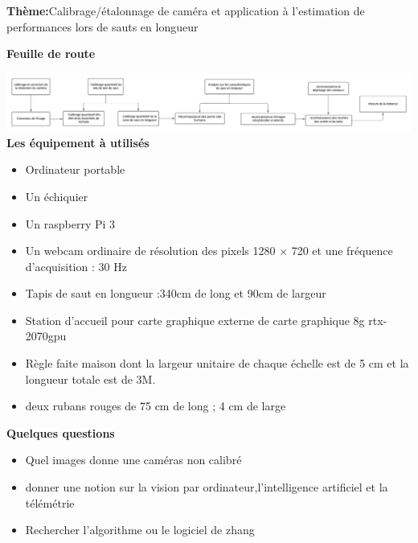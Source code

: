 \documentclass[10pt,a4paper]{article}
\begin{document}
	
	
	\textbf{Thème:}Calibrage/étalonnage de caméra et application à l’estimation de
	performances lors de sauts en longueur 
	
	
	\begin{center}
		\textbf{Feuille de route}
	\end{center}
	
	\includegraphics[scale=0.40]{image/Feuille de route}\\
	
	
\textbf{Les équipement à utilisés}	
	
\begin{itemize}
	\item Ordinateur portable\\
	
	\item Un échiquier \\
	
	\item Un raspberry Pi 3\\
	
	\item Un webcam ordinaire de résolution des pixels 1280 × 720 et une fréquence d'acquisition : 30 Hz \\
	
	\item Tapis de saut en longueur :340cm de long et 90cm de largeur\\
	
	\item Station d'accueil pour carte graphique externe de carte graphique 8g rtx-2070gpu \\
	
	\item Règle faite maison dont la largeur unitaire de chaque échelle est de 5 cm et la longueur totale	est de 3M.\\
	
	\item deux rubans rouges de 75 cm de long ; 4 cm de large
\end{itemize}	
	
	
	
	
	
	
	\begin{center}
		\textbf{Quelques questions}
	\end{center}
	
\begin{itemize}
	\item Quel images donne une caméras non calibré
	\item donner une notion sur la vision par ordinateur,l'intelligence artificiel et la télémétrie\\
	
	\item Rechercher l'algorithme ou le logiciel de zhang 
\end{itemize}	
	
	
	
\end{document}
